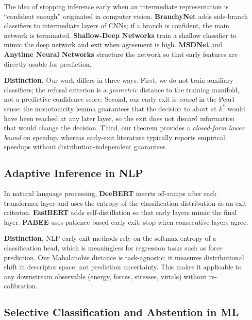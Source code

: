 \documentclass[11pt,a4paper]{article}
\begin{document}
The idea of stopping inference early when an intermediate representation is ``confident enough'' originated in computer vision. \textbf{BranchyNet}\cite{teerapittayanon2016branchynet} adds side-branch classifiers to intermediate layers of CNNs; if a branch is confident, the main network is terminated. \textbf{Shallow-Deep Networks}\cite{kaya2019shallow} train a shallow classifier to mimic the deep network and exit when agreement is high. \textbf{MSDNet}\cite{huang2018msdnet} and \textbf{Anytime Neural Networks}\cite{huang2017anytime} structure the network so that early features are directly usable for prediction.

\textbf{Distinction.} Our work differs in three ways. First, we do not train auxiliary classifiers; the refusal criterion is a \emph{geometric} distance to the training manifold, not a predictive confidence score. Second, our early exit is \emph{causal} in the Pearl sense: the monotonicity lemma guarantees that the decision to abort at $k^*$ would have been reached at any later layer, so the exit does not discard information that would change the decision. Third, our theorem provides a \emph{closed-form lower bound} on speedup, whereas early-exit literature typically reports empirical speedups without distribution-independent guarantees.

\subsection{Adaptive Inference in NLP}

In natural language processing, \textbf{DeeBERT}\cite{xin2020deebert} inserts off-ramps after each transformer layer and uses the entropy of the classification distribution as an exit criterion. \textbf{FastBERT}\cite{liu2020fastbert} adds self-distillation so that early layers mimic the final layer. \textbf{PABEE}\cite{zhou2020pabee} uses patience-based early exit: stop when consecutive layers agree.

\textbf{Distinction.} NLP early-exit methods rely on the softmax entropy of a classification head, which is meaningless for regression tasks such as force prediction. Our Mahalanobis distance is task-agnostic: it measures distributional shift in descriptor space, not prediction uncertainty. This makes it applicable to any downstream observable (energy, forces, stresses, virials) without re-calibration.

\subsection{Selective Classification and Abstention in ML}
\end{document}
